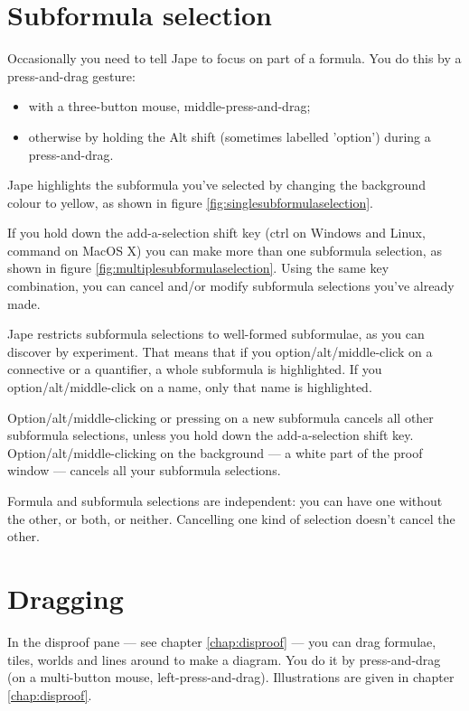\documentclass[11pt]{book}
\newcommand{\figref}[1]{figure \ref{fig:#1}}
\newcommand{\chapref}[1]{chapter \ref{chap:#1}}
\begin{document}
\section{Subformula selection}
\label{sec:subformulaselection}

Occasionally you need to tell Jape to focus on part of a formula. You do this by a press-and-drag gesture:
\begin{itemize}
\item with a three-button mouse, middle-press-and-drag;
\item otherwise by holding the Alt shift (sometimes labelled 'option') during a press-and-drag.
\end{itemize}
Jape highlights the subformula you've selected by changing the background colour to yellow, as shown in \figref{singlesubformulaselection}. 

If you hold down the add-a-selection shift key (ctrl on Windows and Linux, command on MacOS X) you can make more than one subformula selection, as shown in \figref{multiplesubformulaselection}. Using the same key combination, you can cancel and/or modify subformula selections you've already made.

Jape restricts subformula selections to well-formed subformulae, as you can discover by experiment. That means that if you option/alt/middle-click on a connective or a quantifier, a whole subformula is highlighted. If you option/alt/middle-click on a name, only that name is highlighted.

Option/alt/middle-clicking or pressing on a new subformula cancels all other subformula selections, unless you hold down the add-a-selection shift key. Option/alt/middle-clicking on the background --- a white part of the proof window --- cancels all your subformula selections.

Formula and subformula selections are independent: you can have one without the other, or both, or neither. Cancelling one kind of selection doesn't cancel the other. 

\section{Dragging}

In the disproof pane --- see \chapref{disproof} --- you can drag formulae, tiles, worlds and lines around to make a diagram. You do it by press-and-drag (on a multi-button mouse, left-press-and-drag). Illustrations are given in \chapref{disproof}.
\end{document}
